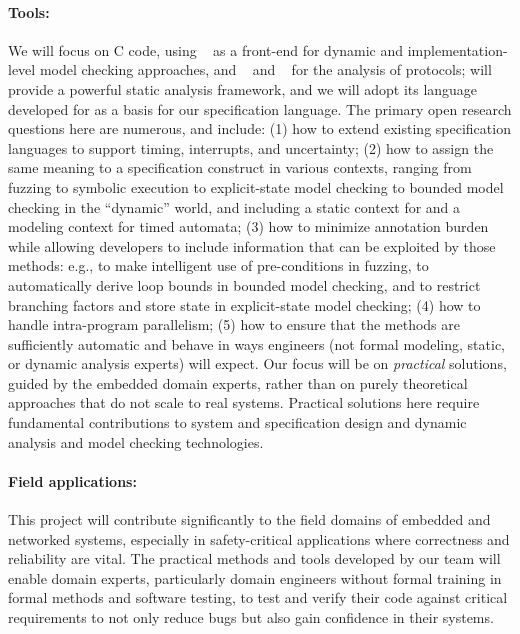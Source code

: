 \paragraph{Tools:} We will focus on C code, using \deepstate~\cite{DeepState}
as a front-end for dynamic and implementation-level model checking approaches, and
\uppaal~\cite{uppaal} and
\prism~\cite{KNP2011:CAV} for the analysis of protocols; \framac will
provide a powerful static analysis framework, and we will adopt its
\acsl language developed for \framac as a basis for our specification language.  The primary open research questions here are numerous, and include:
(1) how to extend existing specification languages to support timing, interrupts,
and uncertainty;
(2) how to assign the same meaning to a specification construct in
  various contexts, ranging from fuzzing to symbolic execution to
  explicit-state model checking to bounded model checking in the
  ``dynamic'' \deepstate world, and including a static context for
  \framac and a modeling context for timed automata;
(3) how to minimize annotation burden while allowing developers to
include information that can be exploited by those methods: e.g., to
make intelligent use of pre-conditions in fuzzing, to automatically
derive loop bounds in bounded model checking, and to restrict
branching factors and store state in explicit-state model checking;
(4) how to handle intra-program parallelism;
(5) how to ensure that the methods are sufficiently automatic
  and behave in ways engineers (not formal modeling, static, or dynamic
  analysis experts) will expect.
Our focus will be on \emph{practical} solutions, guided by the
embedded domain experts, rather than on purely theoretical approaches
that do not scale to real systems. Practical solutions here require
fundamental contributions to system and specification design and
dynamic analysis and model checking technologies.

\paragraph{Field applications:}
This project will contribute significantly to the field domains of embedded and networked systems, especially in safety-critical applications where correctness and reliability are vital.
The practical methods and tools developed by our team will enable domain experts, particularly domain engineers without formal training in formal methods and software testing, to test and verify their code against critical requirements to not only reduce bugs but also gain confidence in their systems.


